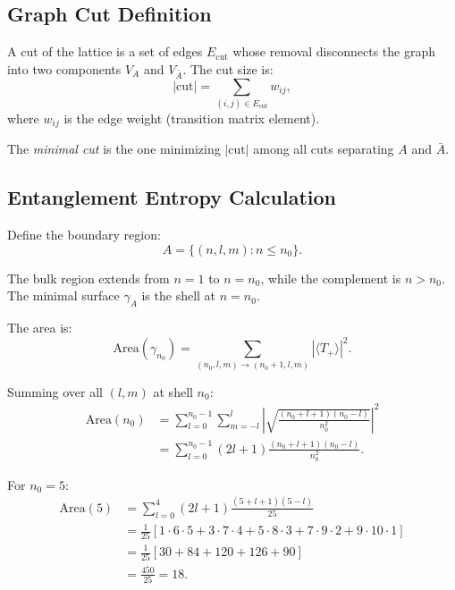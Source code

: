 \documentclass[aps,prd,twocolumn,superscriptaddress,floatfix]{revtex4-2}
\begin{document}
\subsection{Graph Cut Definition}

A cut of the lattice is a set of edges $E_{\text{cut}}$ whose removal disconnects the graph into two components $V_A$ and $V_{\bar{A}}$. The cut size is:
\begin{equation}
|\text{cut}| = \sum_{(i,j) \in E_{\text{cut}}} w_{ij},
\end{equation}
where $w_{ij}$ is the edge weight (transition matrix element).

The \textit{minimal cut} is the one minimizing $|\text{cut}|$ among all cuts separating $A$ and $\bar{A}$.

\subsection{Entanglement Entropy Calculation}

Define the boundary region:
\begin{equation}
A = \{ (n,l,m) : n \leq n_0 \}.
\end{equation}

The bulk region extends from $n=1$ to $n=n_0$, while the complement is $n > n_0$. The minimal surface $\gamma_A$ is the shell at $n = n_0$.

The area is:
\begin{equation}
\text{Area}(\gamma_{n_0}) = \sum_{(n_0,l,m) \to (n_0+1,l,m)} |\langle T_+ \rangle|^2.
\end{equation}

Summing over all $(l,m)$ at shell $n_0$:
\begin{align}
\text{Area}(n_0) &= \sum_{l=0}^{n_0-1} \sum_{m=-l}^{l} \left| \sqrt{\frac{(n_0+l+1)(n_0-l)}{n_0^2}} \right|^2 \\
&= \sum_{l=0}^{n_0-1} (2l+1) \frac{(n_0+l+1)(n_0-l)}{n_0^2}.
\end{align}

For $n_0 = 5$:
\begin{align}
\text{Area}(5) &= \sum_{l=0}^{4} (2l+1) \frac{(5+l+1)(5-l)}{25} \\
&= \frac{1}{25}\left[ 1 \cdot 6 \cdot 5 + 3 \cdot 7 \cdot 4 + 5 \cdot 8 \cdot 3 + 7 \cdot 9 \cdot 2 + 9 \cdot 10 \cdot 1 \right] \\
&= \frac{1}{25}\left[ 30 + 84 + 120 + 126 + 90 \right] \\
&= \frac{450}{25} = 18.
\end{align}
\end{document}
